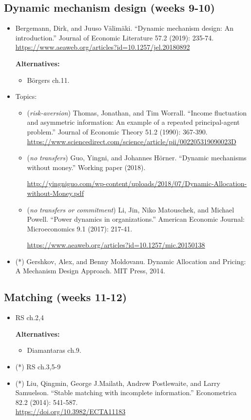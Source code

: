\documentclass{article}
\begin{document}
\subsection{Dynamic mechanism design (weeks 9-10)}
\begin{itemize}
	\item Bergemann, Dirk, and Juuso Välimäki. ``Dynamic mechanism design: An introduction.'' Journal of Economic Literature 57.2 (2019): 235-74. \\
	\url{https://www.aeaweb.org/articles?id=10.1257/jel.20180892}
	
	\textbf{Alternatives:}
	\begin{itemize}
		\item B{\"o}rgers ch.11.
	\end{itemize}
	\item Topics:
	\begin{itemize}
		\item (\emph{risk-aversion}) Thomas, Jonathan, and Tim Worrall. ``Income fluctuation and asymmetric information: An example of a repeated principal-agent problem.'' Journal of Economic Theory 51.2 (1990): 367-390. \url{https://www.sciencedirect.com/science/article/pii/002205319090023D}
		\item (\emph{no transfers}) Guo, Yingni, and Johannes Hörner. ``Dynamic mechanisms without money.'' Working paper (2018). 
		
		\url{http://yingniguo.com/wp-content/uploads/2018/07/Dynamic-Allocation-without-Money.pdf}
		\item (\emph{no transfers or commitment}) Li, Jin, Niko Matouschek, and Michael Powell. ``Power dynamics in organizations.'' American Economic Journal: Microeconomics 9.1 (2017): 217-41.
		
		\url{https://www.aeaweb.org/articles?id=10.1257/mic.20150138}
	\end{itemize}
	\item (*) Gershkov, Alex, and Benny Moldovanu. Dynamic Allocation and Pricing: A Mechanism Design Approach. MIT Press, 2014. 
\end{itemize}

\subsection{Matching (weeks 11-12)}
\begin{itemize}
	\item RS ch.2,4
	
	\textbf{Alternatives:}
	\begin{itemize}
		\item Diamantaras ch.9.
	\end{itemize}
	\item (*) RS ch.3,5-9
	\item (*) Liu, Qingmin, George J.Mailath, Andrew Postlewaite, and Larry Samuelson.  ``Stable matching with incomplete information.'' Econometrica 82.2 (2014): 541-587. \\
	\url{https://doi.org/10.3982/ECTA11183}
\end{itemize}
\end{document}
